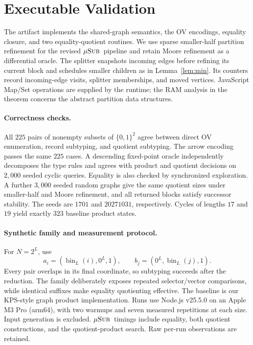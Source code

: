\documentclass[11pt,letterpaper]{article}
\theoremstyle{definition}\newtheorem{definition}[theorem]{Definition}
\newcommand{\musub}{\ensuremath{\mu\textsc{Sub}}}
\newcommand{\bits}{\{0,1\}}
\begin{document}
\FloatBarrier

\section{Executable Validation}\label{sec:exp}
The artifact implements the shared-graph semantics, the OV encodings, equality closure, and two equality-quotient routines. We use sparse smaller-half partition refinement for the revised \musub\ pipeline and retain Moore refinement as a differential oracle. The splitter snapshots incoming edges before refining its current block and schedules smaller children as in Lemma~\ref{lem:min}. Its counters record incoming-edge visits, splitter memberships, and moved vertices. JavaScript Map/Set operations are supplied by the runtime; the RAM analysis in the theorem concerns the abstract partition data structures.

\paragraph{Correctness checks.}
All $225$ pairs of nonempty subsets of $\bits^2$ agree between direct OV enumeration, record subtyping, and quotient subtyping. The arrow encoding passes the same $225$ cases. A descending fixed-point oracle independently decomposes the type rules and agrees with product and quotient decisions on $2,000$ seeded cyclic queries. Equality is also checked by synchronized exploration. A further $3,000$ seeded random graphs give the same quotient sizes under smaller-half and Moore refinement, and all returned blocks satisfy successor stability. The seeds are $1701$ and $20271031$, respectively. Cycles of lengths $17$ and $19$ yield exactly $323$ baseline product states.

\paragraph{Synthetic family and measurement protocol.}
For $N=2^L$, use
\[
 a_i=(\operatorname{bin}_L(i),0^L,1),\qquad
 b_j=(0^L,\operatorname{bin}_L(j),1).
\]
Every pair overlaps in its final coordinate, so subtyping succeeds after the reduction. The family deliberately exposes repeated selector/vector comparisons, while identical suffixes make equality quotienting effective. The baseline is our KPS-style graph product implementation. Runs use Node.js v25.5.0 on an Apple M3 Pro (arm64), with two warmups and seven measured repetitions at each size. Input generation is excluded. \musub\ timings include equality, both quotient constructions, and the quotient-product search. Raw per-run observations are retained.
\end{document}
